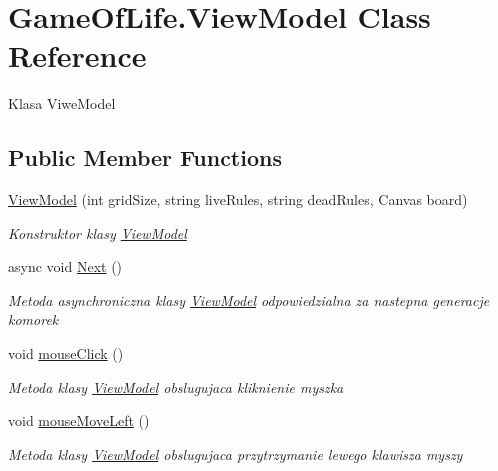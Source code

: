 \hypertarget{class_game_of_life_1_1_view_model}{}\section{Game\+Of\+Life.\+View\+Model Class Reference}
\label{class_game_of_life_1_1_view_model}


Klasa Viwe\+Model  


\subsection*{Public Member Functions}
\begin{DoxyCompactItemize}
\item 
\mbox{\hyperlink{class_game_of_life_1_1_view_model_afaabd55bb1450e02f4c7a1fa02e796ed}{View\+Model}} (int grid\+Size, string live\+Rules, string dead\+Rules, Canvas board)
\begin{DoxyCompactList}\small\item\em Konstruktor klasy \mbox{\hyperlink{class_game_of_life_1_1_view_model}{View\+Model}} \end{DoxyCompactList}\item 
async void \mbox{\hyperlink{class_game_of_life_1_1_view_model_a60b920b1e886ffdb2920d587331bc78a}{Next}} ()
\begin{DoxyCompactList}\small\item\em Metoda asynchroniczna klasy \mbox{\hyperlink{class_game_of_life_1_1_view_model}{View\+Model}} odpowiedzialna za nastepna generacje komorek \end{DoxyCompactList}\item 
void \mbox{\hyperlink{class_game_of_life_1_1_view_model_a853fa14946c2cdbdc05b881725254c8e}{mouse\+Click}} ()
\begin{DoxyCompactList}\small\item\em Metoda klasy \mbox{\hyperlink{class_game_of_life_1_1_view_model}{View\+Model}} obslugujaca kliknienie myszka \end{DoxyCompactList}\item 
void \mbox{\hyperlink{class_game_of_life_1_1_view_model_a81dfc0f6d9955ac237f39a79ed6d071a}{mouse\+Move\+Left}} ()
\begin{DoxyCompactList}\small\item\em Metoda klasy \mbox{\hyperlink{class_game_of_life_1_1_view_model}{View\+Model}} obslugujaca przytrzymanie lewego klawisza myszy \end{DoxyCompactList}\item 

\end{DoxyCompactItemize}
